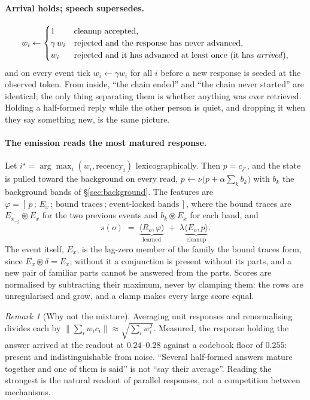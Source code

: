 \documentclass[11pt,a4paper]{article}
\newcommand{\bind}{\mathbin{\circledast}}
\theoremstyle{plain}
\theoremstyle{definition}
\theoremstyle{remark}
\newtheorem{remark}{Remark}
\begin{document}
\paragraph{Arrival holds; speech supersedes.}
\begin{equation}
w_i \leftarrow
\begin{cases}
1 & \text{cleanup accepted},\\
\gamma\, w_i & \text{rejected and the response has never advanced},\\
w_i & \text{rejected and it has advanced at least once (it has \emph{arrived})},
\end{cases}
\label{eq:weight}
\end{equation}
and on every event tick $w_i\leftarrow\gamma w_i$ for all $i$ before a new
response is seeded at the observed token. From inside, ``the chain ended'' and
``the chain never started'' are identical; the only thing separating them is
whether anything was ever retrieved. Holding a half-formed reply while the other
person is quiet, and dropping it when they say something new, is the same
picture.

\paragraph{The emission reads the most matured response.} Let
$i^{\star}=\arg\max_i (w_i, \text{recency}_i)$ lexicographically. Then
$p=c_{i^\star}$, and the state is pulled toward the background on every read,
$p\leftarrow\nu\big(p+\alpha\sum_k b_k\big)$ with $b_k$ the background bands of
\S\ref{sec:background}. The features are
$\varphi=[\,p\,;\,E_x\,;\,\text{bound traces}\,;\,\text{event-locked bands}\,]$,
where the bound traces are $E_{x_{-j}}\bind E_x$ for the two previous events and
$b_k\bind E_x$ for each band, and
\begin{equation}
s(o) \;=\; \underbrace{\langle R_o,\varphi\rangle}_{\text{learned}}
\;+\;\lambda\underbrace{\langle E_o,p\rangle}_{\text{cleanup}} .
\label{eq:score}
\end{equation}
The event itself, $E_x$, is the lag-zero member of the family the bound traces
form, since $E_x\bind\delta=E_x$; without it a conjunction is present without
its parts, and a new pair of familiar parts cannot be answered from the parts.
Scores are normalised by subtracting their maximum, never by clamping them:
the rows are unregularised and grow, and a clamp makes every large score equal.

\begin{remark}[Why not the mixture]
Averaging unit responses and renormalising divides each by
$\|\sum_i w_i c_i\|\approx\sqrt{\sum_i w_i^2}$. Measured, the response holding
the answer arrived at the readout at $0.24$--$0.28$ against a codebook floor of
$0.255$: present and indistinguishable from noise. ``Several half-formed answers
mature together and one of them is said'' is not ``say their average''. Reading
the strongest is the natural readout of parallel responses, not a competition
between mechanisms.
\end{remark}
\end{document}
